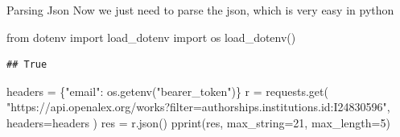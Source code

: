 \documentclass[
  10pt,
  ignorenonframetext,
  aspectratio=169]{beamer}
\newenvironment{Shaded}{\begin{snugshade}}{\end{snugshade}}
\newcommand{\DecValTok}[1]{\textcolor[rgb]{0.86,0.86,0.80}{#1}}
\newcommand{\ImportTok}[1]{\textcolor[rgb]{0.80,0.80,0.80}{#1}}
\newcommand{\NormalTok}[1]{\textcolor[rgb]{0.80,0.80,0.80}{#1}}
\newcommand{\OperatorTok}[1]{\textcolor[rgb]{0.94,0.94,0.82}{#1}}
\newcommand{\StringTok}[1]{\textcolor[rgb]{0.80,0.58,0.58}{#1}}
\begin{document}
\begin{frame}[fragile]{Parsing Json}
\protect\hypertarget{parsing-json}{}
Now we just need to parse the json, which is very easy in python

\scriptsize

\begin{Shaded}
\begin{Highlighting}[]
\ImportTok{from}\NormalTok{ dotenv }\ImportTok{import}\NormalTok{ load\_dotenv}
\ImportTok{import}\NormalTok{ os}
\NormalTok{load\_dotenv()}
\end{Highlighting}
\end{Shaded}

\begin{verbatim}
## True
\end{verbatim}

\begin{Shaded}
\begin{Highlighting}[]
\NormalTok{headers }\OperatorTok{=}\NormalTok{ \{}\StringTok{"email"}\NormalTok{: os.getenv(}\StringTok{"bearer\_token"}\NormalTok{)\}}
\NormalTok{r }\OperatorTok{=}\NormalTok{ requests.get(}
  \StringTok{"https://api.openalex.org/works?filter=authorships.institutions.id:I24830596"}\NormalTok{,}
\NormalTok{  headers}\OperatorTok{=}\NormalTok{headers}
\NormalTok{)}
\NormalTok{res }\OperatorTok{=}\NormalTok{ r.json()}
\NormalTok{pprint(res, max\_string}\OperatorTok{=}\DecValTok{21}\NormalTok{, max\_length}\OperatorTok{=}\DecValTok{5}\NormalTok{)}
\end{Highlighting}
\end{Shaded}


\end{frame}
\end{document}
